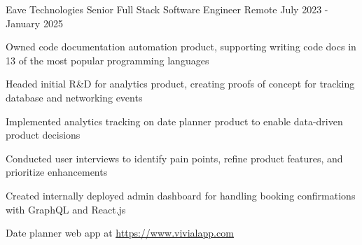 \documentclass[11pt, a4paper]{awesome-cv}
\begin{document}
\makecvheader


\begin{cventries}


  \cventry
    {Eave Technologies}
    {Senior Full Stack Software Engineer}
    {Remote}
    {July 2023 - January 2025}
    {
      \begin{cvitems}
        \item{Owned code documentation automation product, supporting writing code docs in 13 of the most popular programming languages}
        \item{Headed initial R\&D for analytics product, creating proofs of concept for tracking database and networking events}
        \item{Implemented analytics tracking on date planner product to enable data-driven product decisions}
        \item{Conducted user interviews to identify pain points, refine product features, and prioritize enhancements}
        \item{Created internally deployed admin dashboard for handling booking confirmations with GraphQL and React.js}
        \item{Date planner web app at \underline{\href{https://www.vivialapp.com}{https://www.vivialapp.com}}}
      \end{cvitems}
    }


\end{cventries}
\end{document}
